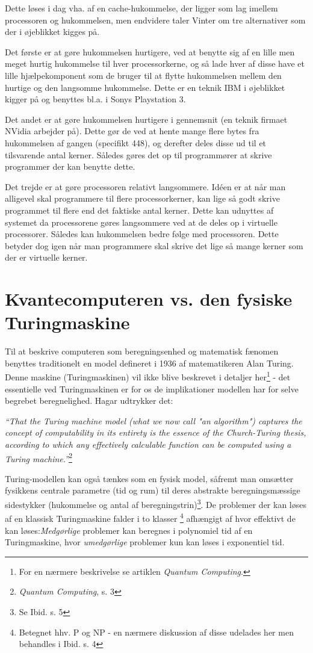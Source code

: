 \documentclass[10pt,a4paper]{article}
\newcommand{\citat}[2]{\begin{justify}\textit{``#1''}\hspace{0.1cm}\footnote{#2}\end{justify}}
\begin{document}
Dette løses i dag vha. af en cache-hukommelse, der ligger som lag imellem processoren og hukommelsen, men endvidere taler Vinter om tre alternativer som der i øjeblikket kigges på.

Det første er at gøre hukommelsen hurtigere, ved at benytte sig af en lille men meget hurtig hukommelse til hver processorkerne, og så lade hver af disse have et lille hjælpekomponent som de bruger til at flytte hukommelsen mellem den hurtige og den langsomme hukommelse. Dette er en teknik IBM i øjeblikket kigger på og benyttes bl.a. i Sonys Playstation 3.

Det andet er at gøre hukommelsen hurtigere i gennemsnit (en teknik firmaet NVidia arbejder på). Dette gør de ved at hente mange flere bytes fra hukommelsen af gangen (specifikt 448), og derefter deles disse ud til et tilsvarende antal kerner. Således gøres det op til programmører at skrive programmer der kan benytte dette.

Det trejde er at gøre processoren relativt langsommere. Idéen er at når man alligevel skal programmere til flere processorkerner, kan lige så godt skrive programmet til flere end det faktiske antal kerner. Dette kan udnyttes af systemet da processorene gøres langsommere ved at de deles op i virtuelle processorer. Således kan hukommelsen bedre følge med processoren. Dette betyder dog igen når man programmere skal skrive det lige så mange kerner som der er virtuelle kerner.

\section{Kvantecomputeren vs. den fysiske Turingmaskine}
Til at beskrive computeren som beregningsenhed og matematisk fænomen
benyttes traditionelt en model defineret i 1936 af matematikeren Alan Turing. 
Denne maskine (Turingmaskinen) vil ikke blive beskrevet i detaljer
her\footnote{For en nærmere beskrivelse se artiklen \textit{Quantum Computing}.}
- det essentielle ved Turingmaskinen er for os de implikationer modellen har
for selve begrebet beregnelighed. Hagar udtrykker det:

\citat{That the Turing machine model (what we now call "an algorithm") captures
the concept of computability in its entirety is the essence of the Church-Turing
thesis, according to which any effectively calculable function can be computed 
using a Turing machine.}
{\textit{Quantum Computing}, s. 3}

Turing-modellen kan også tænkes som en fysisk model, såfremt man 
omsætter fysikkens centrale parametre (tid og rum) til deres 
abstrakte beregningsmæssige sidestykker (hukommelse og antal 
af beregningstrin)\footnote{Se Ibid. s. 5}. 
De problemer der kan løses af en klassisk Turingmaskine falder i 
to klasser \footnote{Betegnet hhv. P og NP - en nærmere diskussion
af disse udelades her men behandles i Ibid. s. 4} afhængigt af hvor
 effektivt de kan løses:\emph{Medgørlige} problemer kan beregnes i
 polynomiel tid af en Turingmaskine, hvor \emph{umedgørlige} problemer
kun kan løses i exponentiel tid. 
\end{document}
